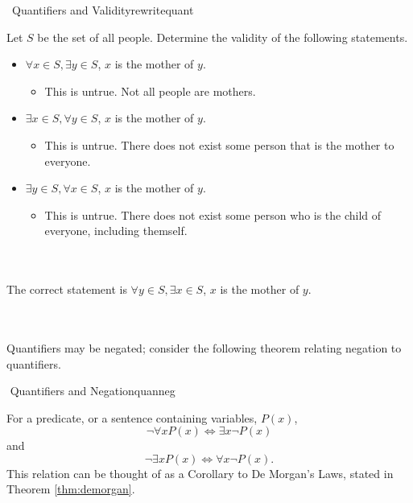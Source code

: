         \begin{exercise}{\Difficulty\,\Difficulty\,\,Quantifiers and Validity}{rewritequant}
        
            Let \(S\) be the set of all people. Determine the validity of the following statements.
            \begin{itemize}
                \item \(\forall x \in S,\exists y\in S\), \(x\) is the mother of \(y\).
                    \begin{itemize}
                        \item This is untrue. Not all people are mothers.
                    \end{itemize}
                \item \(\exists x \in S,\forall y\in S\), \(x\) is the mother of \(y\).
                    \begin{itemize}
                        \item This is untrue. There does not exist some person that is the mother to everyone.
                    \end{itemize}
                \item \(\exists y \in S, \forall x\in S\), \(x\) is the mother of \(y\).
                    \begin{itemize}
                        \item This is untrue. There does not exist some person who is the child of everyone, including themself.
                    \end{itemize}
            \end{itemize}
            \vphantom
            \\
            \\
            The correct statement is \(\forall y\in S,\exists x\in S\), \(x\) is the mother of \(y\).
        
        \end{exercise}
        \vphantom
        \\
        \\
        Quantifiers may be negated; consider the following theorem relating negation to quantifiers.
        \begin{theorem}{\Stop\,\,Quantifiers and Negation}{quanneg}
        
            For a predicate, or a sentence containing variables, \(P(x)\),
            \begin{equation*}
                \neg\forall xP(x)\iff\exists x\neg P(x)
            \end{equation*}
            and
            \begin{equation*}
                \neg\exists xP(x)\iff\forall x\neg P(x).
            \end{equation*}
            This relation can be thought of as a Corollary to De Morgan's Laws, stated in Theorem \ref{thm:demorgan}.
        \end{theorem}
